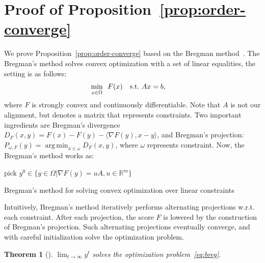 \documentclass[11pt]{article}
\DeclareMathOperator*{\argmin}{arg\,min}
\newtheorem{theorem}{Theorem}
\begin{document}
\section{Proof of Proposition~\ref{prop:order-converge}} \label{prof:order-converge}
We prove Proposition~\ref{prop:order-converge} based on the Bregman method~\cite{Bregman1967TheRM}. The Bregman's  method solves convex optimization with a set of linear equalities, the setting is as follows:
\begin{align} \label{eq:breg}
\min_{x \in \Bar{\Omega}}\ &\ F(x) &\text{s.t.}\ & Ax=b,\,  
\end{align}
where $F$ is strongly convex and continuously differentiable. Note that $A$ is not our alignment, but denotes a matrix that represents constraints. Two important ingredients are Bregman's divergence $ D_F(x,y) =  F(x) - F(y) - \langle \nabla F(y) ,x-y \rangle  $, and Bregman's projection: $ P_{\omega,F}(y) = \argmin_{x\in \omega} D_F(x,y)  $, where $\omega$ represents constraint. Now, the Bregman's method works as:
\begin{algorithm}[ht]
\SetAlgoLined
 pick $ y^0 \in \{y\in \Omega |\nabla F(y) = uA,  u \in \mathbb{R}^m\}$\;
 \caption{Bregman's method for solving convex optimization over linear constraints}
\end{algorithm}
Intuitively, Bregman's method iteratively performs alternating projections w.r.t. each constraint. After each projection, the score $F$ is lowered by the construction of Bregman's projection. Such alternating projections eventually converge, and with careful initialization solve the optimization problem.  
\begin{theorem}[]  \label{tm:bregman}
$ \lim_{t\rightarrow \infty}   y^t  $ solves the optimization problem~\ref{eq:breg}.
\end{theorem}
\end{document}
